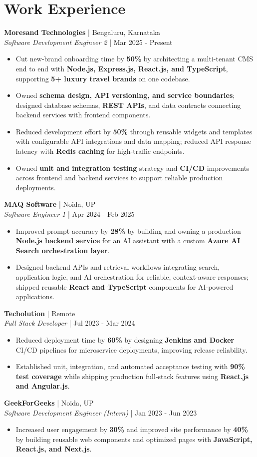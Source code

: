 \documentclass[a4paper,10pt]{article}
\newcommand{\role}[4]{\textbf{#1} | #2\\\textit{#3} | #4\par}
\begin{document}
\section{Work Experience}
\role{Moresand Technologies}{Bengaluru, Karnataka}{Software Development Engineer 2}{Mar 2025 - Present}
\begin{itemize}
\item Cut new-brand onboarding time by \textbf{50\%} by architecting a multi-tenant CMS end to end with \textbf{Node.js, Express.js, React.js, and TypeScript}, supporting \textbf{5+ luxury travel brands} on one codebase.
\item Owned \textbf{schema design, API versioning, and service boundaries}; designed database schemas, \textbf{REST APIs}, and data contracts connecting backend services with frontend components.
\item Reduced development effort by \textbf{50\%} through reusable widgets and templates with configurable API integrations and data mapping; reduced API response latency with \textbf{Redis caching} for high-traffic endpoints.
\item Owned \textbf{unit and integration testing} strategy and \textbf{CI/CD} improvements across frontend and backend services to support reliable production deployments.
\end{itemize}
\role{MAQ Software}{Noida, UP}{Software Engineer 1}{Apr 2024 - Feb 2025}
\begin{itemize}
\item Improved prompt accuracy by \textbf{28\%} by building and owning a production \textbf{Node.js backend service} for an AI assistant with a custom \textbf{Azure AI Search orchestration layer}.
\item Designed backend APIs and retrieval workflows integrating search, application logic, and AI orchestration for reliable, context-aware responses; shipped reusable \textbf{React and TypeScript} components for AI-powered applications.
\end{itemize}
\role{Techolution}{Remote}{Full Stack Developer}{Jul 2023 - Mar 2024}
\begin{itemize}
\item Reduced deployment time by \textbf{60\%} by designing \textbf{Jenkins and Docker} CI/CD pipelines for microservice deployments, improving release reliability.
\item Established unit, integration, and automated acceptance testing with \textbf{90\% test coverage} while shipping production full-stack features using \textbf{React.js and Angular.js}.
\end{itemize}
\role{GeekForGeeks}{Noida, UP}{Software Development Engineer (Intern)}{Jan 2023 - Jun 2023}
\begin{itemize}
\item Increased user engagement by \textbf{30\%} and improved site performance by \textbf{40\%} by building reusable web components and optimized pages with \textbf{JavaScript, React.js, and Next.js}.
\end{itemize}
\end{document}
